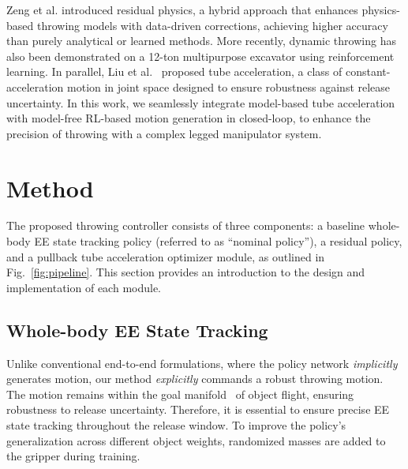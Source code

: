 \documentclass[letterpaper, 10 pt, conference]{ieeeconf} %
\begin{document}
Zeng et al.\cite{zeng2020tossingbot} introduced residual physics, a hybrid approach that enhances physics-based throwing models with data-driven corrections, achieving higher accuracy than purely analytical or learned methods. More recently, dynamic throwing has also been demonstrated on a 12-ton multipurpose excavator using reinforcement learning\cite{werner2024dynamic}. In parallel, Liu et al.~\cite{liu2024tube} proposed tube acceleration, a class of constant-acceleration motion in joint space designed to ensure robustness against release uncertainty. In this work, we seamlessly integrate model-based tube acceleration with model-free RL-based motion generation in closed-loop, to enhance the precision of throwing with a complex legged manipulator system.

%



\section{Method}\label{sec:method}

The proposed throwing controller consists of three components: a baseline whole-body EE state tracking policy (referred to as ``nominal policy''), a residual policy, and a pullback tube acceleration optimizer module, as outlined in Fig.~\ref{fig:pipeline}. This section provides an introduction to the design and implementation of each module.

\subsection{Whole-body EE State Tracking}
Unlike conventional end-to-end formulations, where the policy network \emph{implicitly} generates motion, our method \emph{explicitly} commands a robust throwing motion. The motion remains within the goal manifold~\cite{pekarovskiy2013optimal} of object flight, ensuring robustness to release uncertainty. Therefore, it is essential to ensure precise EE state tracking throughout the release window. To improve the policy’s generalization across different object weights, randomized masses are added to the gripper during training.
\end{document}
